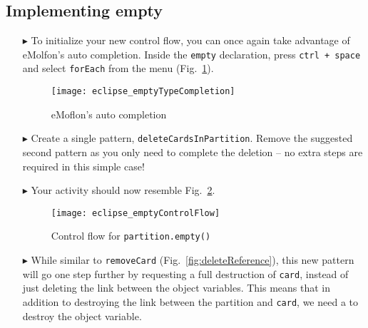 \newpage
\hypertarget{emptyPartition tex}{}
\subsection{Implementing empty}
\texHeader

\begin{itemize}
 
\item[$\blacktriangleright$] To initialize your new control flow, you can once again take advantage of eMolfon's auto completion. Inside the
\texttt{empty} declaration, press  \texttt{ctrl + space} and select \texttt{forEach} from the menu (Fig.~\ref{fig:typeCompletion}).

\vspace{1cm}

\begin{figure}[htpb]
\begin{center}
  \texttt{[image: eclipse\_emptyTypeCompletion]}
  \caption{eMoflon's auto completion}
  \label{fig:typeCompletion}
\end{center}
\end{figure}

\vspace{1cm}

\item[$\blacktriangleright$] Create a single pattern, \texttt{deleteCardsInPartition}. Remove the suggested second pattern as you only need to complete the
deletion -- no extra steps are required in this simple case!

\item[$\blacktriangleright$] Your activity should now resemble Fig.~\ref{fig:emptyControlFlow}.

\clearpage

\begin{figure}[htpb]
\begin{center}
  \texttt{[image: eclipse\_emptyControlFlow]}
  \caption{Control flow for \texttt{partition.empty()}}
  \label{fig:emptyControlFlow}
\end{center}
\end{figure}

\item[$\blacktriangleright$] While similar to \texttt{removeCard} (Fig.~\ref{fig:deleteReference}), this new pattern will go one step further by requesting a
full destruction of \texttt{card}, instead of just deleting the link between the object variables. This means that in addition to destroying the link between
the partition and \texttt{card}, we need a to destroy the object variable.


\end{itemize}
